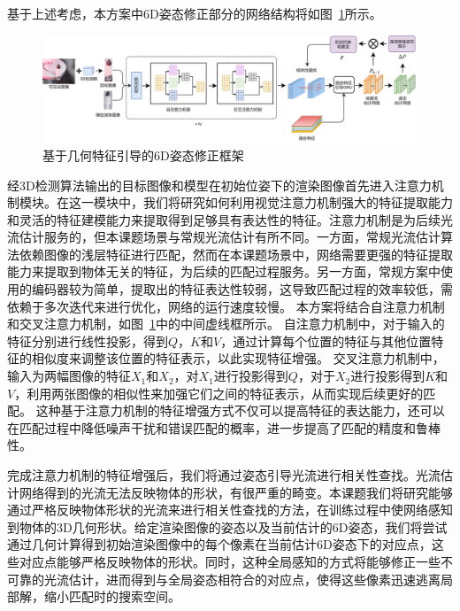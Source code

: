 \documentclass[12pt]{article}
\begin{document}
基于上述考虑，本方案中6D姿态修正部分的网络结构将如图~\ref{fig:geo_guided_6D_refine}所示。
\begin{figure}[h]
    \centering
    \includegraphics[width=\linewidth]{geo_guided_6d_refine.jpg}
    \caption{基于几何特征引导的6D姿态修正框架}
    \label{fig:geo_guided_6D_refine}
\end{figure}
经3D检测算法输出的目标图像和模型在初始位姿下的渲染图像首先进入注意力机制模块。在这一模块中，我们将研究如何利用视觉注意力机制强大的特征提取能力和灵活的特征建模能力来提取得到足够具有表达性的特征。注意力机制是为后续光流估计服务的，但本课题场景与常规光流估计有所不同。一方面，常规光流估计算法依赖图像的浅层特征进行匹配，然而在本课题场景中，网络需要更强的特征提取能力来提取到物体无关的特征，为后续的匹配过程服务。另一方面，常规方案中使用的编码器较为简单，提取出的特征表达性较弱，这导致匹配过程的效率较低，需依赖于多次迭代来进行优化，网络的运行速度较慢。
本方案将结合自注意力机制和交叉注意力机制，如图~\ref{fig:geo_guided_6D_refine}中的中间虚线框所示。
自注意力机制中，对于输入的特征分别进行线性投影，得到$Q$，$K$和$V$，通过计算每个位置的特征与其他位置特征的相似度来调整该位置的特征表示，以此实现特征增强。
交叉注意力机制中，输入为两幅图像的特征$X_1$和$X_2$，对$X_1$进行投影得到$Q$，对于$X_2$进行投影得到$K$和$V$，利用两张图像的相似性来加强它们之间的特征表示，从而实现后续更好的匹配。
这种基于注意力机制的特征增强方式不仅可以提高特征的表达能力，还可以在匹配过程中降低噪声干扰和错误匹配的概率，进一步提高了匹配的精度和鲁棒性。

完成注意力机制的特征增强后，我们将通过姿态引导光流进行相关性查找。光流估计网络得到的光流无法反映物体的形状，有很严重的畸变。本课题我们将研究能够通过严格反映物体形状的光流来进行相关性查找的方法，在训练过程中使网络感知到物体的3D几何形状。给定渲染图像的姿态以及当前估计的6D姿态，我们将尝试通过几何计算得到初始渲染图像中的每个像素在当前估计6D姿态下的对应点，这些对应点能够严格反映物体的形状。同时，这种全局感知的方式将能够修正一些不可靠的光流估计，进而得到与全局姿态相符合的对应点，使得这些像素迅速逃离局部解，缩小匹配时的搜索空间。

\end{document}

